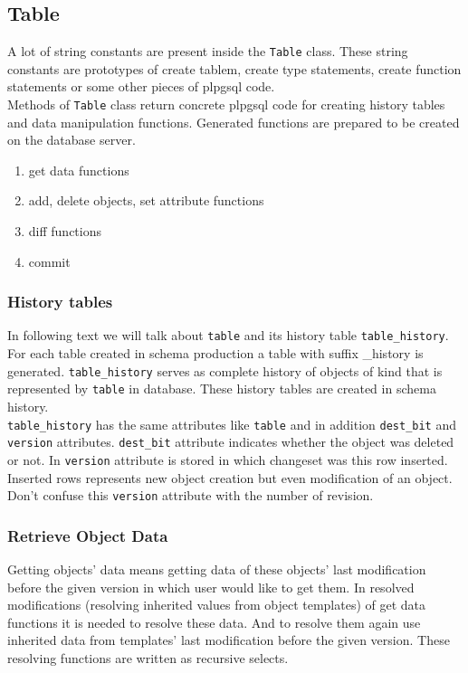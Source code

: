 \documentclass[deska]{subfiles}
\begin{document}
\subsection{Table}
A lot of string constants are present inside the {\tt Table} class. These string constants are prototypes of create tablem, create type statements, create function statements or some other pieces of plpgsql code.\\
Methods of {\tt Table} class return concrete plpgsql code for creating history tables and data manipulation functions. Generated functions are prepared to be created on the database server.\\

\begin{enumerate}
    \item get data functions
    \item add, delete objects, set attribute functions
    \item diff functions
    \item commit
\end{enumerate}

\subsubsection{History tables}
In following text we will talk about {\tt table} and its history table {\tt table\_history}.\\
For each table created in schema production a table with suffix \_history is generated. {\tt table\_history} serves as complete history of objects of kind that is represented by {\tt table} in database. These history tables are created in schema history.\\
{\tt table\_history} has the same attributes like {\tt table} and in addition {\tt dest\_bit} and {\tt version} attributes. {\tt dest\_bit} attribute indicates whether the object was deleted or not. In {\tt version} attribute is stored in which changeset was this row inserted. Inserted rows represents new object creation but even modification of an object. Don't confuse this {\tt version} attribute with the number of revision.

\subsubsection{Retrieve Object Data}
Getting objects' data means getting data of these objects' last modification before the given version in which user would like to get them.
In resolved modifications (resolving inherited values from object templates) of get data functions it is needed to resolve these data. And to resolve them again use inherited data from templates' last modification before the given version.
These resolving functions are written as recursive selects.
\end{document}
